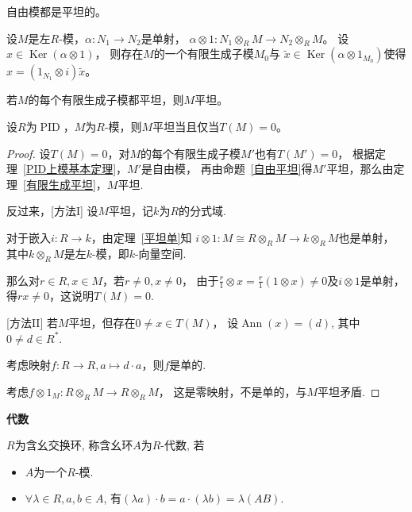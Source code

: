 \begin{proposition}\label{自由平坦}
    自由模都是平坦的。
\end{proposition}

\begin{lemma}
    设$M$是左$R$-模，$\alpha:N_1\rightarrow N_2$是单射，
    $\alpha\otimes1:N_1\otimes_R M\rightarrow N_2\otimes_R M$。
    设$x\in\operatorname{Ker}(\alpha\otimes1)$，
    则存在$M$的一个有限生成子模$M_0$与
    $\tilde{x}\in\operatorname{Ker}(\alpha\otimes1_{M_0})$使得
    $x=(1_{N_1}\otimes i)\tilde{x}$。
\end{lemma}

\begin{theorem}\label{有限生成平坦}
    若$M$的每个有限生成子模都平坦，则$M$平坦。
\end{theorem}

\begin{proposition}
    设$R$为$\operatorname{PID}$，$M$为$R$-模，则$M$平坦当且仅当$T(M)=0$。
\end{proposition}
\begin{proof}
    设$T(M)=0$，对$M$的每个有限生成子模$M'$也有$T(M')=0$，
    根据定理~\ref{PID上模基本定理}，$M'$是自由模，
    再由命题~\ref{自由平坦}得$M'$平坦，那么由定理~\ref{有限生成平坦}，$M$平坦.

    反过来，\textcolor{a9a9a9}{[方法I]} 设$M$平坦，记$k$为$R$的分式域.\par
    对于嵌入$i:R\rightarrow k$，由定理~\ref{平坦单}知
    $i\otimes1:M\cong R\otimes_R M\rightarrow k\otimes_R M$也是单射，
    其中$k\otimes_R M$是左$k$-模，即$k$-向量空间.\par
    那么对$r\in R,x\in M$，若$r\neq0,x\neq0$，
    由于$\frac{r}{1}\otimes x=\frac{r}{1}(1\otimes x)\neq0$及$i\otimes1$是单射，
    得$rx\neq0$，这说明$T(M)=0$.\par

    \textcolor{a9a9a9}{[方法II]} 若$M$平坦，但存在$0\neq x\in T(M)$，
    设$\operatorname{Ann}(x)=(d)$, 其中$0\neq d\in R^*$.\par
    考虑映射$f:R\rightarrow R,a\mapsto d\cdot a$，则$f$是单的.\par
    考虑$f\otimes 1_M: R\otimes_R M \rightarrow R\otimes_R M$，
    这是零映射，不是单的，与$M$平坦矛盾.
\end{proof}

\begin{definition} \textbf{代数}\par
    $R$为含幺交换环, 称含幺环$A$为$R$-代数, 若
        \begin{itemize}
            \item[(1)] $A$为一个$R$-模.
            \item[(2)] $\forall \lambda \in R, a,b\in A$, 
            有$(\lambda a)\cdot b=a\cdot (\lambda b)=\lambda(AB)$.
        \end{itemize}
\end{definition}

